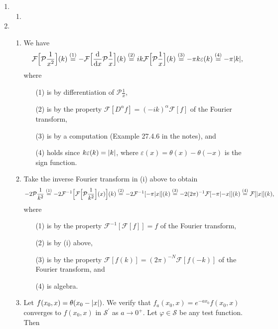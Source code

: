 \documentclass[11pt]{article}
\newcommand{\eq}[1]{\overset{(#1)}{=}}
\begin{document}
\begin{enumerate}
    \item\begin{enumerate}[label=(\roman*)]
        \item
    \end{enumerate}

    \hrulefill

    \item\begin{enumerate}[label=(\roman*)]
        \item We have
        \[\mathcal F\Big[\mathcal P\frac{1}{x^2}\Big](k) \eq{1} - \mathcal F\Big[\dv{x}\mathcal P\frac{1}{x}\Big](k) \eq{2} ik\mathcal F\Big[\mathcal P \frac{1}{x}\Big](k) \eq{3} -\pi k\varepsilon(k) \eq{4} -\pi\abs{k},\] where \begin{enumerate}
            \item[(1)] is by differentiation of $\mathcal P\frac{1}{x}$, 
            \item[(2)] is by the property $\mathcal F[D^\alpha f] = (-ik)^\alpha\mathcal F[f]$ of the Fourier transform,
            \item[(3)] is by a computation (Example 27.4.6 in the notes), and
            \item[(4)] holds since $k\varepsilon(k) = \abs{k}$, where $\varepsilon(x) = \theta(x)-\theta(-x)$ is the sign function.
        \end{enumerate}
        \item Take the inverse Fourier transform in (i) above to obtain
        \[-2\mathcal P \frac{1}{k^2} \eq{1} -2\mathcal F^{-1}\Big[\mathcal F\Big[\mathcal P\frac{1}{k^2}\Big](x)\Big](k) \eq{2} -2\mathcal F^{-1}[-\pi\abs{x}](k) \eq{3} -2(2\pi)^{-1}\mathcal F[-\pi\abs{-x}](k) \eq{4} \mathcal{F}[\abs{x}](k),\] where \begin{enumerate}
            \item[(1)] is by the property $\mathcal F^{-1}[\mathcal F[f]] = f$ of the Fourier transform,
            \item[(2)] is by (i) above,
            \item[(3)] is by the property $\mathcal F[f(k)] = (2\pi)^{-N}\mathcal F[f(-k)]$ of the Fourier transform, and
            \item[(4)] is algebra.
        \end{enumerate}
        \item Let $f(x_0,x) = \theta(x_0-\abs{x})$. We verify that $f_a(x_0,x) = e^{-ax_0}f(x_0,x)$ converges to $f(x_0,x)$ in $\mathcal S^\prime$ as $a\to 0^+$. Let $\varphi\in \mathcal S$ be any test function. Then 

\end{enumerate}
\end{enumerate}
\end{document}
